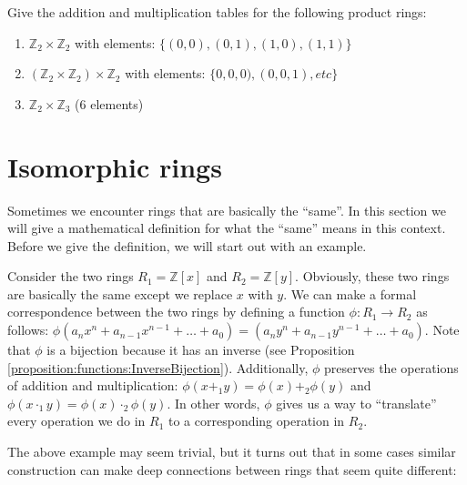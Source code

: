 \begin{exercise}
Give the addition and multiplication tables for the following product rings:
\begin{enumerate}
\item ${\mathbb Z}_2\times {\mathbb Z}_2$ with elements: $\{(0,0),(0,1),(1,0),(1,1)\}$ 
\item $({\mathbb Z}_2\times {\mathbb Z}_2)\times {\mathbb Z}_2$ with elements: $\{0,0,0),(0,0,1),etc\}$
\item ${\mathbb Z}_2\times {\mathbb Z}_3$ (6 elements)
\end{enumerate}
\end{exercise}

\section{Isomorphic rings}
\label{sec:IsomorphicRings}

Sometimes we encounter rings that are basically the ``same''.  In this section we will give a mathematical definition for what the ``same'' means in this context.  Before we give the definition, we will start out with an example.

\begin{example}
Consider the two rings $R_1={\mathbb Z}[x]$ and $R_2={\mathbb Z}[y]$.  Obviously, these two rings are basically the same except we replace $x$ with $y$.  We can make a formal correspondence between the two rings by defining a function $\phi:R_1\rightarrow R_2$ as follows: $\phi(a_nx^n+a_{n-1}x^{n-1}+\ldots +a_0)=(a_ny^n+a_{n-1}y^{n-1}+\ldots +a_0)$.  Note that $\phi$ is a bijection because it has an inverse (see Proposition \ref{proposition:functions:InverseBijection}).  Additionally, $\phi$ preserves the operations of addition and multiplication:  $\phi(x+_1y)=\phi(x)+_2\phi(y)$ and
$\phi(x\cdot_1y)=\phi(x)\cdot_2\phi(y)$.  In other words, $\phi$ gives us a way to ``translate'' every operation we do in $R_1$ to a corresponding operation in $R_2$.
\end{example}
The above example may seem trivial, but it turns out that in some cases similar construction can make deep connections between rings that seem quite different:

